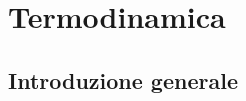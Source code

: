 \documentclass[10pt,a4paper]{book}
\begin{document}
\chapter{Termodinamica}

\section{Introduzione generale}
\end{document}
